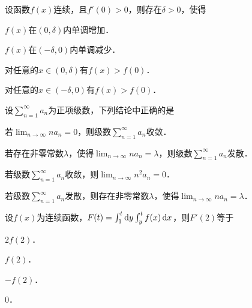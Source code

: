 \documentclass[plain,noanswer,medmath]{../../template/jnuexam}
\begin{document}
\begin{problem}
设函数$f(x)$连续，且$f'(0) > 0$，则存在$\delta > 0$，使得\pickout{}
\begin{abcd}
\item $f(x)$在$(0,\delta)$内单调增加．
\item $f(x)$在$(- \delta ,0)$内单调减少．
\item 对任意的$x \in(0,\delta)$有$f(x) > f(0)$．
\item 对任意的$x \in(- \delta ,0)$有$f(x) > f(0)$．
\end{abcd}
\end{problem}


\begin{problem}
设$\sum_{n = 1}^{\infty}a_n$为正项级数，下列结论中正确的是\pickout{}
\begin{abcd}
\item 若$\lim_{n \to \infty} na_n = 0$，则级数$\sum_{n = 1}^{\infty}a_n$收敛．
\item 若存在非零常数$\lambda$，使得$\lim_{n \to \infty} na_n = \lambda$，则级数$\sum_{n = 1}^{\infty}a_n$发散．
\item 若级数$\sum_{n = 1}^{\infty}a_n$收敛，则$\lim_{n \to \infty} n^2a_n = 0$．
\item 若级数$\sum_{n = 1}^{\infty}a_n$发散，则存在非零常数$\lambda$，使得$\lim_{n \to \infty} na_n = \lambda$．
\end{abcd}
\end{problem}


\begin{problem}
设$f(x)$为连续函数，$F(t) = \int_1^t \mathop{}\!\mathrm{d} y\int_y^t f(x)\mathop{}\!\mathrm{d} x$，则$F'(2)$等于\pickout{}
\begin{abcd}
\item $2f(2)$．
\item $f(2)$．
\item $- f(2)$．
\item $0$．
\end{abcd}
\end{problem}
\end{document}
